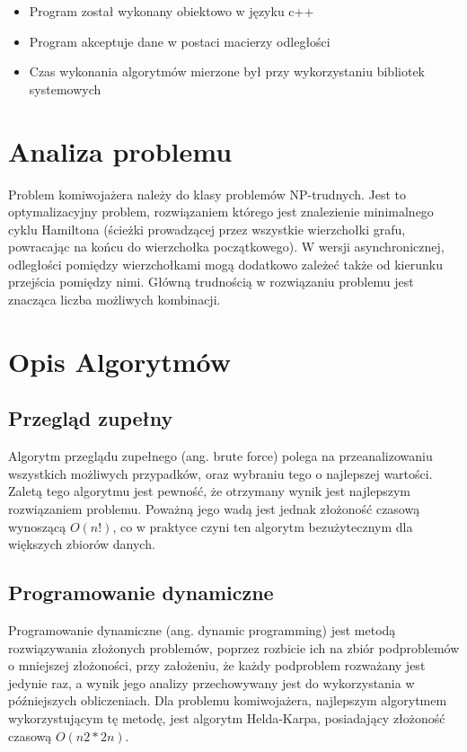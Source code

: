 \documentclass{article}
\begin{document}
\begin{itemize}
\item Program został wykonany obiektowo w języku c++
\item Program akceptuje dane w postaci macierzy odległości
\item Czas wykonania algorytmów mierzone był przy wykorzystaniu
bibliotek systemowych
\end{itemize}

\section{Analiza problemu}

Problem komiwojażera należy do klasy problemów NP-trudnych. Jest to
optymalizacyjny problem, rozwiązaniem którego jest znalezienie minimalnego cyklu Hamiltona
(ścieżki prowadzącej przez wszystkie wierzchołki grafu, powracając na końcu do wierzchołka
początkowego). W wersji asynchronicznej, odległości pomiędzy
wierzchołkami mogą dodatkowo zależeć także od kierunku przejścia pomiędzy nimi. Główną
trudnością w rozwiązaniu problemu jest znacząca liczba możliwych kombinacji.


\section{Opis Algorytmów}

\subsection{Przegląd zupełny}

Algorytm przeglądu zupełnego (ang. brute force) polega na przeanalizowaniu wszystkich
możliwych przypadków, oraz wybraniu tego o najlepszej wartości. Zaletą tego algorytmu jest pewność,
że otrzymany wynik jest najlepszym rozwiązaniem problemu. Poważną jego wadą jest jednak
złożoność czasową wynoszącą $O(n!)$, co w praktyce czyni ten algorytm bezużytecznym dla większych
zbiorów danych.

\subsection{Programowanie dynamiczne}

Programowanie dynamiczne (ang. dynamic programming) jest metodą rozwiązywania złożonych
problemów, poprzez rozbicie ich na zbiór podproblemów o mniejszej złożoności, przy założeniu, że
każdy podproblem rozważany jest jedynie raz, a wynik jego analizy przechowywany jest do
wykorzystania w późniejszych obliczeniach. Dla problemu komiwojażera, najlepszym algorytmem
wykorzystującym tę metodę, jest algorytm Helda-Karpa, posiadający złożoność czasową $O(n2 * 2n)$.
\end{document}
